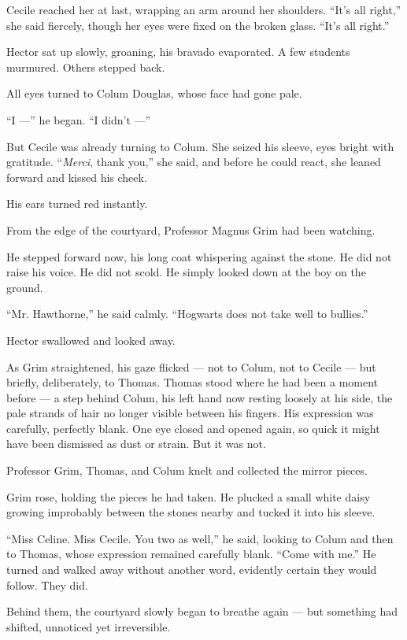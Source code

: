 Cecile reached her at last, wrapping an arm around her shoulders. \enquote{It's all right,} she said fiercely, though her eyes were fixed on the broken glass. \enquote{It's all right.}
 
Hector sat up slowly, groaning, his bravado evaporated. A few students murmured. Others stepped back.
 
All eyes turned to Colum Douglas, whose face had gone pale.
 
\enquote{I ---} he began. \enquote{I didn't ---}
 
But Cecile was already turning to Colum. She seized his sleeve, eyes bright with gratitude. \enquote{\textit{Merci}, thank you,} she said, and before he could react, she leaned forward and kissed his cheek.
 
His ears turned red instantly.
 
From the edge of the courtyard, Professor Magnus Grim had been watching.
 
He stepped forward now, his long coat whispering against the stone. He did not raise his voice. He did not scold. He simply looked down at the boy on the ground.
 
\enquote{Mr. Hawthorne,} he said calmly. \enquote{Hogwarts does not take well to bullies.}
 
Hector swallowed and looked away.
 
As Grim straightened, his gaze flicked --- not to Colum, not to Cecile --- but briefly, deliberately, to Thomas. Thomas stood where he had been a moment before --- a step behind Colum, his left hand now resting loosely at his side, the pale strands of hair no longer visible between his fingers. His expression was carefully, perfectly blank. One eye closed and opened again, so quick it might have been dismissed as dust or strain. But it was not.
 
Professor Grim, Thomas, and Colum knelt and collected the mirror pieces.
 
Grim rose, holding the pieces he had taken. He plucked a small white daisy growing improbably between the stones nearby and tucked it into his sleeve.
 
\enquote{Miss Celine. Miss Cecile. You two as well,} he said, looking to Colum and then to Thomas, whose expression remained carefully blank. \enquote{Come with me.} He turned and walked away without another word, evidently certain they would follow. They did.
 
Behind them, the courtyard slowly began to breathe again --- but something had shifted, unnoticed yet irreversible.
 
